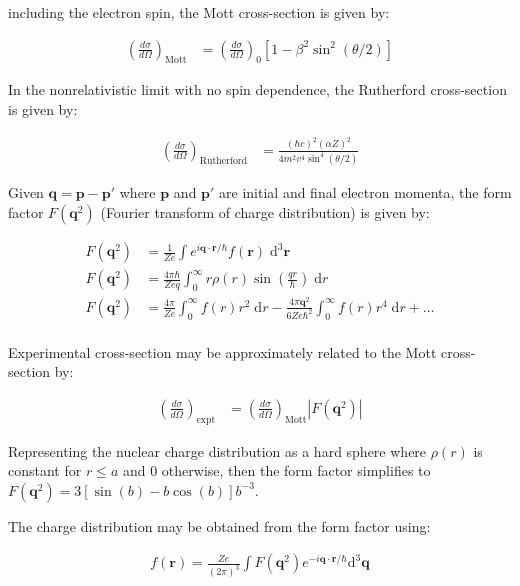 \documentclass[10pt]{article}
\theoremstyle{definition}
\begin{document}
including the electron spin, the Mott cross-section is given by:

\begin{align}
    \left(\frac{d\sigma}{d\Omega}\right)_{\text{Mott}} &=
    \left(\frac{d\sigma}{d\Omega}\right)_0 [1-\beta^2\sin^2(\theta/2)]
\end{align}


In the nonrelativistic limit with no spin dependence, the Rutherford cross-section is given by:

\begin{align}
    \left(\frac{d\sigma}{d\Omega}\right)_{\text{Rutherford}} &=
    \frac{(\hbar c)^2 (\alpha Z)^2}{4m^2 v^4 \sin^4(\theta/2)}
\end{align}

Given $\mathbf{q} = \mathbf{p} - \mathbf{p}'$ where $\mathbf{p}$ and $\mathbf{p}'$ are initial and final electron momenta, the form factor $F(\mathbf{q}^2)$ (Fourier transform of charge distribution) is given by:

\begin{align}
    F(\mathbf{q}^2) &= \frac{1}{Ze} \int e^{i\mathbf{q}\cdot\mathbf{r}/\hbar} f(\mathbf{r})\; \text{d}^3\mathbf{r}\\
    F(\mathbf{q}^2) &= \frac{4\pi\hbar}{Zeq}\int_{0}^{\infty} r \rho(r) \sin\left(\frac{qr}{\hbar}\right)\;\text{d}r\\
    F(\mathbf{q}^2) &= \frac{4\pi}{Ze}\int_{0}^{\infty} f(r)r^2\;\text{d}r - \frac{4\pi\mathbf{q}^2}{6Ze\hbar^2}\int_0^{\infty}f(r) r^4\;\text{d}r + \dots\\
\end{align}

Experimental cross-section may be approximately related to the Mott cross-section by:

\begin{align}
    \left(\frac{d\sigma}{d\Omega}\right)_{\text{expt}} &=
    \left(\frac{d\sigma}{d\Omega}\right)_{\text{Mott}} |F(\mathbf{q}^2)|
\end{align}

Representing the nuclear charge distribution as a hard sphere where $\rho(r)$ is constant for $r\leq a$ and 0 otherwise, then the form factor simplifies to $F(\mathbf{q}^2)=3[\sin(b)-b\cos(b)]b^{-3}$.\newline

The charge distribution may be obtained from the form factor using:

\begin{align}
    f(\mathbf{r}) = \frac{Ze}{(2\pi)^3}\int F(\mathbf{q}^2) e^{-i\mathbf{q}\cdot\mathbf{r}/\hbar}\text{d}^3\mathbf{q}
\end{align}
\end{document}
